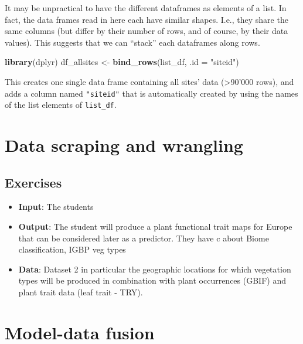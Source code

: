\documentclass[]{book}
\newenvironment{Shaded}{\begin{snugshade}}{\end{snugshade}}
\newcommand{\DataTypeTok}[1]{\textcolor[rgb]{0.13,0.29,0.53}{#1}}
\newcommand{\KeywordTok}[1]{\textcolor[rgb]{0.13,0.29,0.53}{\textbf{#1}}}
\newcommand{\NormalTok}[1]{#1}
\newcommand{\StringTok}[1]{\textcolor[rgb]{0.31,0.60,0.02}{#1}}
\providecommand{\tightlist}{%
  \setlength{\itemsep}{0pt}\setlength{\parskip}{0pt}}
\begin{document}
It may be unpractical to have the different dataframes as elements of a list. In fact, the data frames read in here each have similar shapes. I.e., they share the same columns (but differ by their number of rows, and of course, by their data values). This suggests that we can ``stack'' each dataframes along rows.

\begin{Shaded}
\begin{Highlighting}[]
\KeywordTok{library}\NormalTok{(dplyr)}
\NormalTok{df_allsites <-}\StringTok{ }\KeywordTok{bind_rows}\NormalTok{(list_df, }\DataTypeTok{.id =} \StringTok{"siteid"}\NormalTok{)}
\end{Highlighting}
\end{Shaded}

This creates one single data frame containing all sites' data (\textgreater{}90'000 rows), and adds a column named \texttt{"siteid"} that is automatically created by using the names of the list elements of \texttt{list\_df}.

\hypertarget{data-scraping-and-wrangling}{%
\chapter{Data scraping and wrangling}\label{data-scraping-and-wrangling}}

\hypertarget{exercises-2}{%
\section{Exercises}\label{exercises-2}}

\begin{itemize}
\tightlist
\item
  \textbf{Input}: The students
\item
  \textbf{Output}: The student will produce a plant functional trait maps for Europe that can be considered later as a predictor. They have c about Biome classification, IGBP veg types
\item
  \textbf{Data}: Dataset 2 in particular the geographic locations for which vegetation types will be produced in combination with plant occurrences (GBIF) and plant trait data (leaf trait - TRY).
\end{itemize}

\hypertarget{model-data-fusion}{%
\chapter{Model-data fusion}\label{model-data-fusion}}
\end{document}
